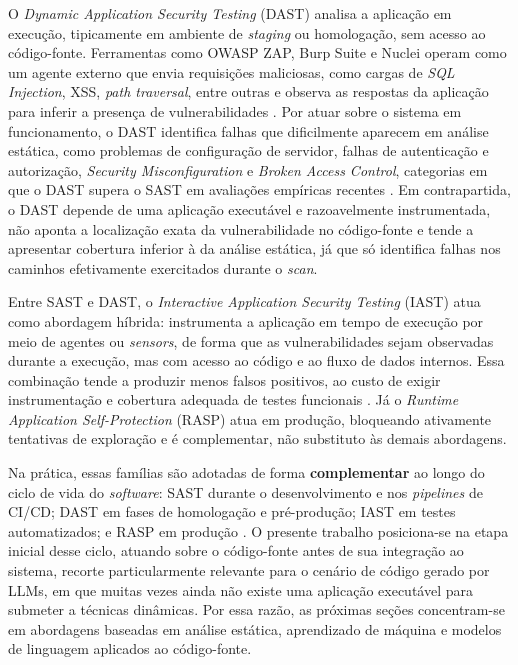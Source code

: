 O \textit{Dynamic Application Security Testing} (DAST) analisa a
aplicação em execução, tipicamente em ambiente de \textit{staging} ou
homologação, sem acesso ao código-fonte. Ferramentas como OWASP ZAP,
Burp Suite e Nuclei operam como um agente externo que envia requisições
maliciosas, como cargas de \textit{SQL Injection}, XSS, \textit{path
traversal}, entre outras e observa as respostas da aplicação para
inferir a presença de vulnerabilidades \cite{owasp_devsecops,ranasinghe2025comparative}.
Por atuar sobre o sistema em funcionamento, o DAST identifica falhas
que dificilmente aparecem em análise estática, como problemas de
configuração de servidor, falhas de autenticação e autorização,
\textit{Security Misconfiguration} e \textit{Broken Access Control},
categorias em que o DAST supera o SAST em avaliações empíricas
recentes \cite{ranasinghe2025comparative}. Em contrapartida, o DAST
depende de uma aplicação executável e razoavelmente instrumentada, não
aponta a localização exata da vulnerabilidade no código-fonte e tende a
apresentar cobertura inferior à da análise estática, já que só
identifica falhas nos caminhos efetivamente exercitados durante o
\textit{scan}.

Entre SAST e DAST, o \textit{Interactive Application Security Testing}
(IAST) atua como abordagem híbrida: instrumenta a aplicação em tempo
de execução por meio de agentes ou \textit{sensors}, de forma que as
vulnerabilidades sejam observadas durante a execução, mas com acesso ao
código e ao fluxo de dados internos. Essa combinação tende a produzir
menos falsos positivos, ao custo de exigir instrumentação e cobertura
adequada de testes funcionais \cite{elder2023comparison,owasp_devsecops}.
Já o \textit{Runtime Application Self-Protection} (RASP) atua em
produção, bloqueando ativamente tentativas de exploração e é
complementar, não substituto às demais abordagens.

Na prática, essas famílias são adotadas de forma \textbf{complementar}
ao longo do ciclo de vida do \textit{software}: SAST durante o
desenvolvimento e nos \textit{pipelines} de CI/CD; DAST em fases de
homologação e pré-produção; IAST em testes automatizados; e RASP em
produção \cite{owasp_devsecops}. O presente trabalho posiciona-se na
etapa inicial desse ciclo, atuando sobre o código-fonte antes de sua
integração ao sistema, recorte particularmente relevante para o
cenário de código gerado por LLMs, em que muitas vezes ainda não existe
uma aplicação executável para submeter a técnicas dinâmicas. Por essa
razão, as próximas seções concentram-se em abordagens baseadas em
análise estática, aprendizado de máquina e modelos de linguagem
aplicados ao código-fonte.

